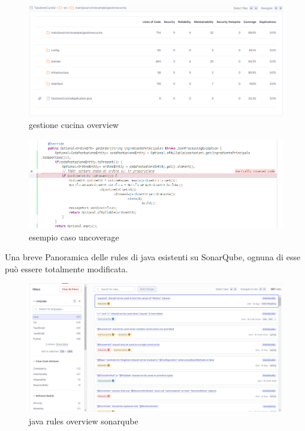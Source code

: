 \begin{figure}[htbp]
	\centering
	\includegraphics[scale=0.40]{iterazione1/images/gestione_cucina_overview.png}
	\caption{gestione cucina overview\label{fig:gestione cucina overview}}
\end{figure}

\begin{figure}[htbp]
	\centering
	\includegraphics[scale=0.60]{iterazione1/images/esempio_caso_uncoverage.png}
	\caption{esempio caso uncoverage\label{fig:esempio caso uncoverage}}
\end{figure}

\newpage
Una breve Panoramica delle rules di java esistenti su SonarQube, ognuna di esse può essere totalmente modificata.
\begin{figure}[htbp]
	\centering
	\includegraphics[scale=0.30]{iterazione1/images/java_rules.png}
	\caption{java rules overview sonarqube\label{fig:java rules}}
\end{figure}

\clearpage